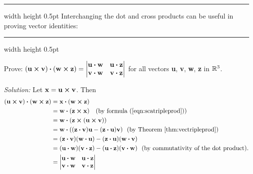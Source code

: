 \hrule width \textwidth height 0.5pt
\newpage
Interchanging the dot and cross products can be useful in proving vector identities:

\vspace{3mm}
\hrule width \textwidth height 0.5pt
\begin{exmp}\label{exmp:quadcrossdot}
 Prove: $(\textbf{u} \bm{\times} \textbf{v}) \bm{\cdot} (\textbf{w} \bm{\times} \textbf{z}) =
 \begin{vmatrix}
   \textbf{u} \bm{\cdot} \textbf{w} & \textbf{u} \bm{\cdot} \textbf{z}\\
   \textbf{v} \bm{\cdot} \textbf{w} & \textbf{v} \bm{\cdot} \textbf{z}\end{vmatrix}$ for all vectors \textbf{u},
   \textbf{v}, \textbf{w}, \textbf{z} in $\mathbb{R}^{3}$.\vspace{0.5mm}
 \par\noindent\emph{Solution:} Let $\textbf{x} = \textbf{u} \bm{\times} \textbf{v}$. Then
 \begin{align*}
  (\textbf{u} \bm{\times} \textbf{v}) \bm{\cdot} (\textbf{w} \bm{\times} \textbf{z}) &=
   \textbf{x} \bm{\cdot} (\textbf{w} \bm{\times} \textbf{z})\\
  &= \textbf{w} \bm{\cdot} (\textbf{z} \bm{\times} \textbf{x}) \text{~~~(by formula (\ref{eqn:scatripleprod}))}\\
  &= \textbf{w} \bm{\cdot} (\textbf{z} \bm{\times} (\textbf{u} \bm{\times} \textbf{v}))\\
  &= \textbf{w} \bm{\cdot} ((\textbf{z} \bm{\cdot} \textbf{v})\textbf{u} -
   (\textbf{z} \bm{\cdot} \textbf{u})\textbf{v}) \text{~~(by Theorem \ref{thm:vectripleprod})}\\
  &= (\textbf{z} \bm{\cdot} \textbf{v})(\textbf{w} \bm{\cdot} \textbf{u}) -
  (\textbf{z} \bm{\cdot} \textbf{u})(\textbf{w} \bm{\cdot} \textbf{v})\\
  &= (\textbf{u} \bm{\cdot} \textbf{w})(\textbf{v} \bm{\cdot} \textbf{z}) -
  (\textbf{u} \bm{\cdot} \textbf{z})(\textbf{v} \bm{\cdot} \textbf{w}) \text{~~(by commutativity of the dot product).}\\
  &= \begin{vmatrix}
   \textbf{u} \bm{\cdot} \textbf{w} & \textbf{u} \bm{\cdot} \textbf{z}\\
   \textbf{v} \bm{\cdot} \textbf{w} & \textbf{v} \bm{\cdot} \textbf{z}\end{vmatrix}
 \end{align*}
\end{exmp}\vspace{-7.5mm}
